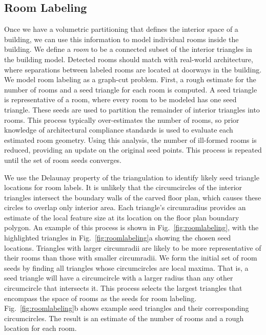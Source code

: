 \documentclass[10pt,twocolumn,twoside]{IEEEtran}
\begin{document}
\subsection{Room Labeling}
\label{ssec:rooms}

Once we have a volumetric partitioning that defines the interior space of a building, we can use this information to model individual rooms inside the building.  We define a \textit{room} to be a connected subset of the interior triangles in the building model.  Detected rooms should match with real-world architecture, where separations between labeled rooms are located at doorways in the building.  We model room labeling as a graph-cut problem.  First, a rough estimate for the number of rooms and a seed triangle for each room is computed.  A seed triangle is representative of a room, where every room to be modeled has one seed triangle.  These seeds are used to partition the remainder of interior triangles into rooms.  This process typically over-estimates the number of rooms, so prior knowledge of architectural compliance standards is used to evaluate each estimated room geometry.  Using this analysis, the number of ill-formed rooms is reduced, providing an update on the original seed points.  This process is repeated until the set of room seeds converges.

We use the Delaunay property of the triangulation to identify likely seed triangle locations for room labels.  It is unlikely that the circumcircles of the interior triangles intersect the boundary walls of the carved floor plan, which causes these circles to overlap only interior area.  Each triangle's circumradius provides an estimate of the local feature size at its location on the floor plan boundary polygon.  An example of this process is shown in Fig.~\ref{fig:roomlabeling}, with the highlighted triangles in Fig.~\ref{fig:roomlabeling}a showing the chosen seed locations. Triangles with larger circumradii are likely to be more representative of their rooms than those with smaller circumradii.  We form the initial set of room seeds by finding all triangles whose circumcircles are local maxima.  That is, a seed triangle will have a circumcircle with a larger radius than any other circumcircle that intersects it. This process selects the largest triangles that encompass the space of rooms as the seeds for room labeling.  Fig.~\ref{fig:roomlabeling}b shows example seed triangles and their corresponding circumcircles.  The result is an estimate of the number of rooms and a rough location for each room.
\end{document}
